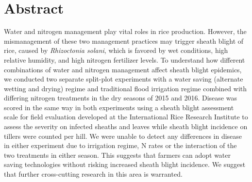 \documentclass[10pt,letterpaper]{article}
\date{}
\newcommand{\getIndex}[2]{
  \ForEach{,}{\IfEq{#1}{\thislevelitem}{\number\thislevelcount\ExitForEach}{}}{#2}
}
\newcommand{\getAff}[1]{
  \getIndex{#1}{University of Southern Queensland,International Rice Research Institute}
}
\begin{document}
\vspace*{0.2in}

\section*{Abstract}
Water and nitrogen management play vital roles in rice production.
However, the mismanagement of these two management practices may trigger
sheath blight of rice, caused by \emph{Rhizoctonia solani}, which is
favored by wet conditions, high relative humidity, and high nitrogen
fertilizer levels. To understand how different combinations of water and
nitrogen management affect sheath blight epidemics, we conducted two
separate split-plot experiments with a water saving (alternate wetting
and drying) regime and traditional flood irrigation regime combined with
differing nitrogen treatments in the dry seasons of 2015 and 2016.
Disease was scored in the same way in both experiments using a sheath
blight assessment scale for field evaluation developed at the
International Rice Research Institute to assess the severity on infected
sheaths and leaves while sheath blight incidence on tillers were counted
per hill. We were unable to detect any differences in disease in either
experiment due to irrigation regime, N rates or the interaction of the
two treatments in either season. This suggests that farmers can adopt
water saving technologies without risking increased sheath blight
incidence. We suggest that further cross-cutting research in this area
is warranted.
\end{document}
